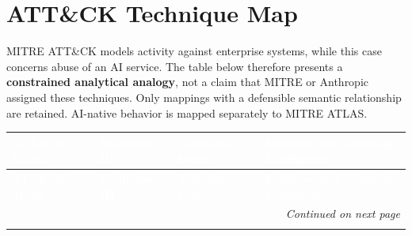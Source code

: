 \documentclass[11pt,a4paper]{article}
\begin{document}
\newpage

\section{ATT\&CK Technique Map}

MITRE ATT\&CK models activity against enterprise systems, while this case concerns abuse of an AI service. The table below therefore presents a \textbf{constrained analytical analogy}, not a claim that MITRE or Anthropic assigned these techniques. Only mappings with a defensible semantic relationship are retained. AI-native behavior is mapped separately to MITRE ATLAS.

\small
\begin{longtable}{|p{2.5cm}|p{1.8cm}|p{3.2cm}|p{6.8cm}|}
\hline
\rowcolor{headerblue}
\textcolor{white}{\textbf{ATT\&CK Tactic}} & \textcolor{white}{\textbf{Technique ID}} & \textcolor{white}{\textbf{Technique Name}} & \textcolor{white}{\textbf{Evidence and Mapping Confidence}} \\
\hline
\endfirsthead

\hline
\rowcolor{headerblue}
\textcolor{white}{\textbf{ATT\&CK Tactic}} & \textcolor{white}{\textbf{Technique ID}} & \textcolor{white}{\textbf{Technique Name}} & \textcolor{white}{\textbf{Evidence and Mapping Confidence}} \\
\hline
\endhead

\hline
\multicolumn{4}{|r|}{\small\itshape Continued on next page} \\
\hline
\endfoot

\hline
\endlastfoot


\end{longtable}
\end{document}

